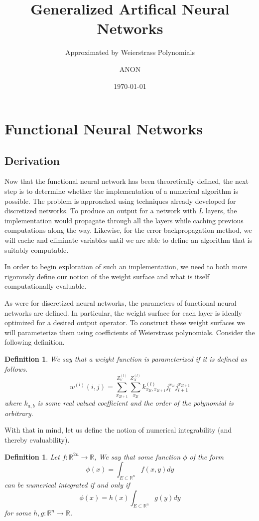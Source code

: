 \documentclass[titlepage, twoside]{article}
\title{Generalized Artifical Neural Networks}
\subtitle{Approximated by Weierstrass Polynomials}
\author{ANON}
\date{\today}
\numberwithin{equation}{subsection}
\newtheorem{definition}[theorem]{Definition}
\numberwithin{theorem}{subsection}
\begin{document}
\maketitle

\section{Functional Neural Networks}




\subsection{Derivation}
Now that the functional neural network has been theoretically defined, the next step is to determine whether the implementation of a numerical algorithm is possible. The problem is approached using techniques already developed for discretized networks. To produce an output for a network with $L$ layers, the implementation would propagate through all the layers while caching previous computations along the way. Likewise, for the error backpropagation method, we will cache and eliminate variables until we are able to define an algorithm that is suitably computable. 

In order to begin exploration of such an implementation, we need to both more rigorously define our notion of the weight surface and what is itself computationally evaluable.


As were for discretized neural networks, the parameters of functional neural networks are defined. In particular, the weight surface for each layer is ideally optimized for a desired output operator. To construct these weight surfaces we will parameterize them using  coefficients of Weierstrass polynomials. Consider the following definition.
\begin{definition} We say that a weight function is parameterized if it is defined as follows.
\begin{equation}
w^{(l)}(i,j) = 
    \sum_{x_{2l+1}}^{Z^{(l)}_Y} \sum_{x_{2l}}^{Z^{(l)}_X} k^{(l)}_{x_{2l},x_{2l+1}}j_{l}^{x_{2l}}j_{l+1}^{x_{2l+1}}
\end{equation}
where $k_{a,b}$ is some real valued coefficient and the order of the polynomial is arbitrary.
\end{definition}

With that in mind, let us define the notion of numerical integrability (and thereby evaluability).
\begin{definition} \label{nint}
Let $f: \mathbb{R}^{2n}\to\mathbb{R}$, 
We say that some function $\phi$ of the form \begin{equation}\phi(x) = \int_{E\subset\mathbb{R}^n}{f(x,y)dy}\end{equation} can be numerical integrated if and only if
\begin{equation}\phi(x) = h(x)\int_{E\subset\mathbb{R}^n}{g(y)dy}\end{equation} for some $h,g: \mathbb{R}^{n}\to\mathbb{R}$.
\end{definition}
\end{document}
